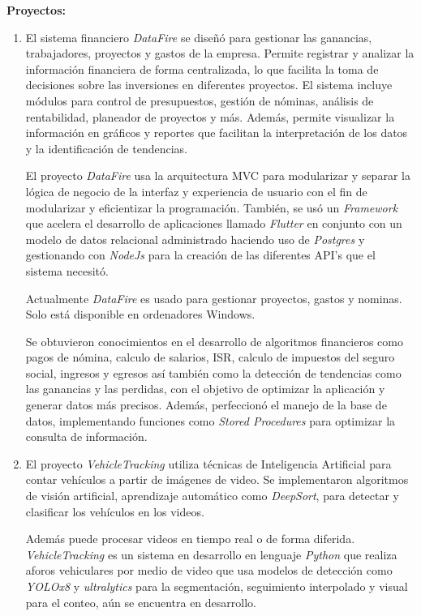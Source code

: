 \documentclass[protocolo.tex]{subfiles}
\begin{document}
\textbf{Proyectos:}
\begin{enumerate}
\item El sistema financiero \textit{DataFire} se diseñó para gestionar las ganancias,  
trabajadores,  proyectos  y  gastos  de  la  empresa.  
Permite  registrar  y  analizar  la  información  financiera  de  forma  centralizada,  lo  que  facilita  
la  toma  de  decisiones  sobre  las  inversiones  en  diferentes  proyectos.  
El  sistema  incluye  módulos  para  control  de  presupuestos,  gestión  de  nóminas,  análisis  de  rentabilidad,
planeador de proyectos y más.  Además,  permite  visualizar  la  información  en  gráficos  y  
reportes  que  facilitan  la  interpretación  de  los  datos  y  la  identificación  de  tendencias.\vspace{5mm} 

El proyecto \textit{DataFire} usa la arquitectura MVC para modularizar y separar la lógica de negocio de la interfaz y experiencia de usuario con el fin de modularizar y eficientizar la programación. 
También, se usó un \textit{Framework} que acelera el desarrollo de aplicaciones llamado \textit{Flutter} en conjunto con un modelo de datos relacional administrado haciendo uso de \textit{Postgres} 
y gestionando con \textit{NodeJs} para la creación de las diferentes API’s que el sistema necesitó.\vspace{5mm} 

Actualmente \textit{DataFire} es usado para gestionar proyectos, gastos y nominas. Solo está disponible en ordenadores Windows.

Se obtuvieron conocimientos en el desarrollo de algoritmos financieros como pagos de nómina, calculo de salarios, ISR, calculo de impuestos del seguro social, ingresos y egresos así también como la detección de tendencias como las ganancias y las perdidas, con el objetivo de optimizar la aplicación y generar datos más precisos. Además,  perfeccionó el manejo de la base de datos, implementando funciones como \textit{Stored Procedures} para optimizar la consulta de información.

\item El proyecto \textit{VehicleTracking} utiliza técnicas de Inteligencia Artificial para  contar  vehículos  a  partir  de  imágenes  de  video.  Se  implementaron  algoritmos  de visión  artificial,  aprendizaje  automático como \textit{DeepSort}, para  detectar  y  clasificar  los  vehículos  en  los  videos.  

Además  puede  procesar  videos  en  tiempo  real  o  de  forma  diferida.
\textit{VehicleTracking} es un sistema en desarrollo en lenguaje \textit{Python} que realiza aforos vehiculares por medio de video que usa modelos de detección como \textit{YOLOx8} y \textit{ultralytics} para la segmentación, seguimiento interpolado y visual para el conteo, aún se encuentra en desarrollo.\vspace{5mm} 



\end{enumerate}
\end{document}
